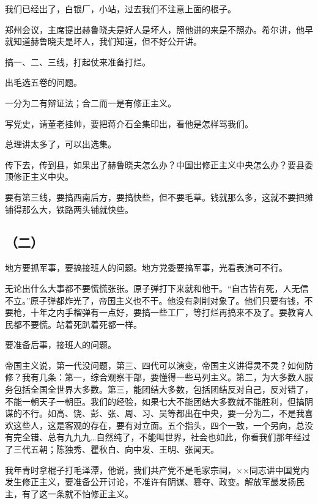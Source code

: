 我们已经出了，白银厂，小站，过去我们不注意上面的根子。

郑州会议，主席提出赫鲁晓夫是好人是坏人，照他讲的来是不照办。希尔讲，他早就知道赫鲁晓夫是坏人，我们知道，但不好公开讲。

搞一、二、三线，打起仗来准备打烂。

出毛选五卷的问题。

一分为二有辩证法；合二而一是有修正主义。

写党史，请董老挂帅，要把蒋介石全集印出，看他是怎样骂我们。

总理讲太多了，可以出选集。

传下去，传到县，如果出了赫鲁晓夫怎么办？中国出修正主义中央怎么办？要县委顶修正主义中央。

要有第三线，要搞西南后方，要搞快些，但不要毛草。钱就那么多，这就不要把摊铺得那么大，铁路两头铺就快些。

\subsection{（二）}

地方要抓军事，要搞接班人的问题。地方党委要搞军事，光看表演可不行。

无论出什么大事都不要慌慌张张。原子弹打下来就和他干。“自古皆有死，人无信不立。”原子弹都炸光了，帝国主义也不干。他没有剥削对象了。他们只要有钱，不要枪，十年之内手榴弹有一点好，要搞一些工厂，等打烂再搞来不及了。要教育人民都不要慌。站着死趴着死都一样。

要准备后事，接班人的问题。

帝国主义说，第一代没问题，第三、四代可以演变，帝国主义讲得灵不灵？如何防修？我有几条：第一，综合观察干部，要懂得一些马列主义。第二，为大多数人服务包括全国全世界大多数。第三，能团结大多数，包括团结反对自己，反对错了，不能一朝天子一朝臣。我们的经验，如果七大不能团结大多数就不能胜利，但搞阴谋的不行。如高、饶、彭、张、周、习、吴等都出在中央，要一分为二，不是我喜欢这些人，这是客观的存在，要有对立面。五个指头，四个一致，一个另向，总没有完全错、总有九九九…自然纯了，不能叫世界，社会也如此，你看我们那年经过了三代五朝；陈独秀、瞿秋白、向中发、王明、张闻天。

我年青时拿棍子打毛泽潭，他说，我们共产党不是毛家宗祠，××同志讲中国党内发生修正主义，要准备公开讨论，不准许有阴谋、篡夺、政变。解放军最发扬民主，有了这一条就不怕修正主义。